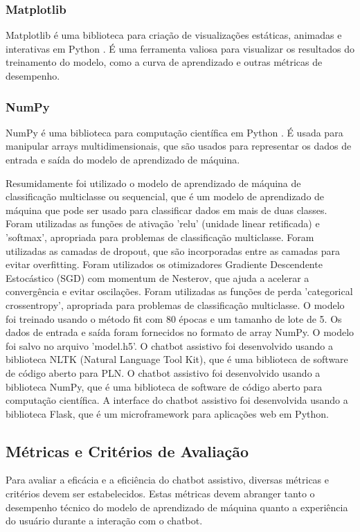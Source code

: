 \documentclass[conference]{IEEEtran}
\begin{document}
\subsubsection{Matplotlib}
Matplotlib é uma biblioteca para criação de visualizações estáticas, 
animadas e interativas em Python \cite{Hunter2007}. 
É uma ferramenta valiosa para visualizar os resultados do treinamento do modelo, 
como a curva de aprendizado e outras métricas de desempenho.

\subsubsection{NumPy}
NumPy é uma biblioteca para computação científica em Python \cite{Harris2020}.
É usada para manipular arrays multidimensionais,
que são usados para representar os dados de entrada e saída do modelo de aprendizado de máquina.


Resumidamente foi utilizado o modelo de aprendizado de máquina de classificação multiclasse ou sequencial, que é um modelo
de aprendizado de máquina que pode ser usado para classificar dados em mais de duas classes.
Foram utilizadas as funções de ativação 'relu' (unidade linear retificada) e 'softmax', apropriada para problemas de classificação multiclasse.
Foram utilizadas as camadas de dropout, que são incorporadas entre as camadas para evitar overfitting.
Foram utilizados os otimizadores Gradiente Descendente Estocástico (SGD) com momentum de Nesterov, que ajuda a acelerar a convergência e evitar oscilações.
Foram utilizadas as funções de perda 'categorical crossentropy', apropriada para problemas de classificação multiclasse.
O modelo foi treinado usando o método fit com 80 épocas e um tamanho de lote de 5.
Os dados de entrada e saída foram fornecidos no formato de array NumPy.
O modelo foi salvo no arquivo 'model.h5'.
O chatbot assistivo foi desenvolvido usando a biblioteca NLTK (Natural Language Tool Kit), que é uma biblioteca de software
de código aberto para PLN. 
O chatbot assistivo foi desenvolvido usando a biblioteca NumPy, que é uma biblioteca de software
de código aberto para computação científica.
A interface do chatbot assistivo foi desenvolvida usando a biblioteca Flask, 
que é um microframework para aplicações web em Python.


\subsection{Métricas e Critérios de Avaliação}

Para avaliar a eficácia e a eficiência do chatbot assistivo, diversas métricas e critérios devem ser estabelecidos. 
Estas métricas devem abranger tanto o desempenho técnico do modelo de aprendizado de máquina 
quanto a experiência do usuário durante a interação com o chatbot.
\end{document}
